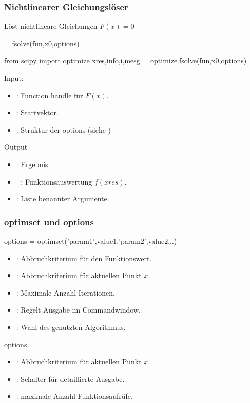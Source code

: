 \documentclass[hyperref={xetex}]{beamer}
\begin{document}
\begin{frame}[fragile]\frametitle{Nichtlinearer Gleichungslöser}
Löst nichtlineare Gleichungen $F(x) = 0$
\begin{matlabin}
  = fsolve(fun,x0,options)
\end{matlabin}
\begin{pyin}
from scipy import optimize
xres,info,i,mesg = optimize.fsolve(fun,x0,options)   
\end{pyin}
Input:
\begin{itemize}
 \item {}: Function handle für $F(x)$.
\item {}: Startvektor.
\item {}: Struktur der options (siehe )
\end{itemize}
Output
\begin{itemize}
  \item {}: Ergebnis.
  \item {}| : Funktionsauswertung $f(xres)$.
  \item {}: Liste benannter Argumente.
\end{itemize}

\end{frame}

\begin{frame}[fragile]\frametitle{optimset und options}
\begin{matlabin}
options = optimset('param1',value1,'param2',value2,..) 
\end{matlabin}
\begin{itemize}
 \item {}: Abbruchkriterium für den Funktionswert.
\item {}: Abbruchkriterium für aktuellen Punkt $x$.
\item {}: Maximale Anzahl Iterationen.
\item {}: Regelt Ausgabe im Commandwindow.
\item {}: Wahl des genutzten Algorithmus.
\end{itemize}
\begin{pyin}
options  
\end{pyin}
\begin{itemize}
  \item {}: Abbruchkriterium für aktuellen Punkt $x$. 
  \item {}: Schalter für detaillierte Ausgabe.
  \item {}: maximale Anzahl Funktionsaufrüfe.
\end{itemize}
\end{frame}
\end{document}
